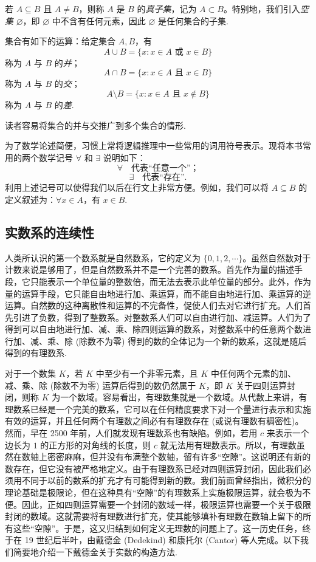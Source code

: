若 $A\subseteq B$ 且 $A\ne B$，则称 $A$ 是 $B$ 的\emph{真子集}，记为 $A\subset B$。特别地，我们引入\emph{空集} $\varnothing$，即 $\varnothing$ 中不含有任何元素，因此 $\varnothing$ 是任何集合的子集.

集合有如下的运算：给定集合 $A,B$，有
\[
  A\cup B=\{x:x\in A\text{ 或 }x\in B\}
\]
称为 $A$ 与 $B$ 的\emph{并}；
\[
  A\cap B=\{x:x\in A\text{ 且 }x\in B\}
\]
称为 $A$ 与 $B$ 的\emph{交}；
\[
  A\setminus B=\{x:x\in A\text{ 且 }x\notin B\}
\]
称为 $A$ 与 $B$ 的\emph{差}.

读者容易将集合的并与交推广到多个集合的情形.

为了数学论述简便，习惯上常将逻辑推理中一些常用的词用符号表示。现将本书常用的两个数学记号 $\forall$ 和 $\exists$ 说明如下：
\[
  \forall \quad \text{代表``任意一个''；}
\]
\[
  \exists \quad \text{代表``存在''.}
\]
利用上述记号可以使得我们以后在行文上非常方便。例如，我们可以将 $A\subseteq B$ 的定义叙述为：$\forall x\in A$，有 $x\in B$.

\subsection{实数系的连续性}
\label{subsec:ma-1-1-2}

人类所认识的第一个数系就是自然数系，它的定义为 $\{0,1,2,\cdots\}$。虽然自然数对于计数来说是够用了，但是自然数系并不是一个完善的数系。首先作为量的描述手段，它只能表示一个单位量的整数倍，而无法去表示此单位量的部分。此外，作为量的运算手段，它只能自由地进行加、乘运算，而不能自由地进行加、乘运算的逆运算。自然数的这种离散性和运算的不完备性，促使人们去对它进行扩充。人们首先引进了负数，得到了整数系。对整数系人们可以自由进行加、减运算。人们为了得到可以自由地进行加、减、乘、除四则运算的数系，对整数系中的任意两个数进行加、减、乘、除 (除数不为零) 得到的数的全体记为一个新的数系，这就是随后得到的有理数系.

对于一个数集 $K$，若 $K$ 中至少有一个非零元素，且 $K$ 中任何两个元素的加、减、乘、除 (除数不为零) 运算后得到的数仍然属于 $K$，即 $K$ 关于四则运算封闭，则称 $K$ 为一个数域。容易看出，有理数集就是一个数域。从代数上来讲，有理数系已经是一个完美的数系，它可以在任何精度要求下对一个量进行表示和实施有效的运算，并且任何两个有理数之间必有有理数存在 (或说有理数有稠密性)。然而，早在 2500 年前，人们就发现有理数系也有缺陷。例如，若用 $c$ 来表示一个边长为 $1$ 的正方形的对角线的长度，则 $c$ 就无法用有理数表示。所以，有理数虽然在数轴上密密麻麻，但并没有布满整个数轴，留有许多``空隙''。这说明还有新的数存在，但它没有被严格地定义。由于有理数系已经对四则运算封闭，因此我们必须用不同于以前的数系的扩充才有可能得到新的数。我们前面曾经指出，微积分的理论基础是极限论，但在这种具有``空隙''的有理数系上实施极限运算，就会极为不便。因此，正如四则运算需要一个封闭的数域一样，极限运算也需要一个关于极限封闭的数域。这就需要将有理数进行扩充，使其能够填补有理数在数轴上留下的所有这些``空隙''。于是，这又归结到如何定义无理数的问题上了。这一历史任务，终于在 19 世纪后半叶，由戴德金 (Dedekind) 和康托尔 (Cantor) 等人完成。以下我们简要地介绍一下戴德金关于实数的构造方法.

